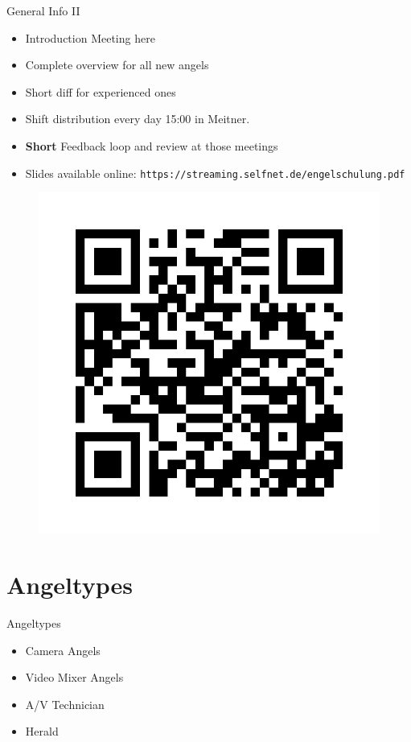 \documentclass[aspectratio=169]{beamer}
\begin{document}
\begin{frame}{General Info II}
	\begin{itemize}
		\item Introduction Meeting here
		\item Complete overview for all new angels
		\item Short diff for experienced ones
		\item Shift distribution every day 15:00 in Meitner.
		\item \textbf{Short} Feedback loop and review at those meetings
		\item Slides available online: \texttt{https://streaming.selfnet.de/engelschulung.pdf}%
	\end{itemize}
	\begin{figure} 
		\centering
		\includegraphics[height=0.4\textheight]{images/qrcode.png}
	\end{figure}
\end{frame}

\section{Angeltypes}
\begin{frame}{Angeltypes}
	\begin{itemize}
		\item Camera Angels
		\item Video Mixer Angels
		\item A/V Technician
		\item Herald
	\end{itemize}
\end{frame}
\end{document}
